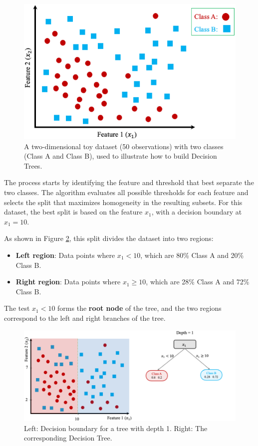\documentclass[
]{book}
\providecommand{\tightlist}{%
  \setlength{\itemsep}{0pt}\setlength{\parskip}{0pt}}
\theoremstyle{definition}
\theoremstyle{definition}
\theoremstyle{definition}
\theoremstyle{definition}
\theoremstyle{remark}
\begin{document}
\begin{figure}

{\centering \includegraphics[width=0.65\linewidth]{images/ex_tree_1} 

}

\caption{A two-dimensional toy dataset (50 observations) with two classes (Class A and Class B), used to illustrate how to build Decision Trees.}\label{fig:tree-1}
\end{figure}

The process starts by identifying the feature and threshold that best separate the two classes. The algorithm evaluates all possible thresholds for each feature and selects the split that maximizes homogeneity in the resulting subsets. For this dataset, the best split is based on the feature \(x_1\), with a decision boundary at \(x_1 = 10\).

As shown in Figure \ref{fig:tree-2}, this split divides the dataset into two regions:

\begin{itemize}
\tightlist
\item
  \textbf{Left region}: Data points where \(x_1 < 10\), which are 80\% Class A and 20\% Class B.\\
\item
  \textbf{Right region}: Data points where \(x_1 \geq 10\), which are 28\% Class A and 72\% Class B.
\end{itemize}

The test \(x_1 < 10\) forms the \textbf{root node} of the tree, and the two regions correspond to the left and right branches of the tree.

\begin{figure}

{\centering \includegraphics[width=0.9\linewidth]{images/ex_tree_2} 

}

\caption{Left: Decision boundary for a tree with depth 1. Right: The corresponding Decision Tree.}\label{fig:tree-2}
\end{figure}
\end{document}
